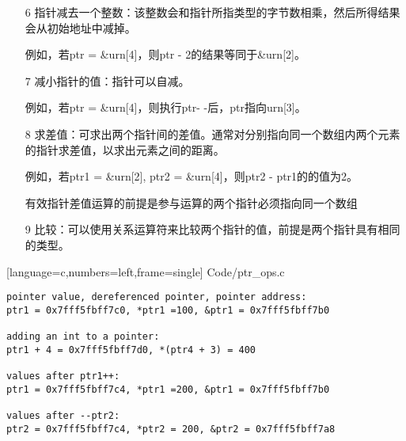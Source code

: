 \begin{frame}[fragile]\ft{\secname}
\begin{itemize}
\item[6] 指针减去一个整数：该整数会和指针所指类型的字节数相乘，然后所得结果会从初始地址中减掉。\\[0.1in]
\item[] 例如，若{\tf ptr = \&urn[4]}，则{\tf ptr - 2}的结果等同于{\tf \&urn[2]}。
\\[0.2in]

\item[7] 减小指针的值：指针可以自减。\\[0.1in]
\item[] 例如，若{\tf ptr = \&urn[4]}，则执行{\tf ptr- -}后，{\tf ptr}指向{\tf urn[3]}。
\end{itemize}
\end{frame}

\begin{frame}[fragile]\ft{\secname}
\begin{itemize}
\item[8] 求差值：可求出两个指针间的差值。通常对分别指向同一个数组内两个元素的指针求差值，以求出元素之间的距离。\\[0.1in]
\item[] 例如，若{\tf ptr1 = \&urn[2], ptr2 = \&urn[4]}，则{\tf ptr2 - ptr1}的的值为2。\\[0.1in]
\item[]
\textcolor{acolor1}{有效指针差值运算的前提是参与运算的两个指针必须指向同一个数组}
\\[0.2in]

\item[9] 比较：可以使用关系运算符来比较两个指针的值，前提是两个指针具有相同的类型。
\end{itemize}
\end{frame}

\begin{frame}\ft{\secname}

[language=c,numbers=left,frame=single]
{Code/ptr_ops.c}
\end{frame}


\begin{frame}[fragile]\ft{\secname}
\begin{lstlisting}[backgroundcolor=\color{red!20}]
pointer value, dereferenced pointer, pointer address:
ptr1 = 0x7fff5fbff7c0, *ptr1 =100, &ptr1 = 0x7fff5fbff7b0

adding an int to a pointer:
ptr1 + 4 = 0x7fff5fbff7d0, *(ptr4 + 3) = 400

values after ptr1++:
ptr1 = 0x7fff5fbff7c4, *ptr1 =200, &ptr1 = 0x7fff5fbff7b0

values after --ptr2:
ptr2 = 0x7fff5fbff7c4, *ptr2 = 200, &ptr2 = 0x7fff5fbff7a8

\end{lstlisting}
\end{frame}

